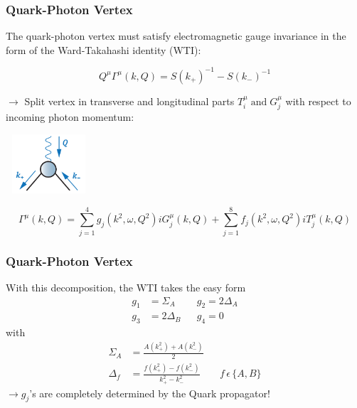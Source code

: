 \begin{frame}\frametitle{Quark-Photon Vertex}
The quark-photon vertex must satisfy electromagnetic gauge invariance in the form of the
Ward-Takahashi identity (WTI):

\begin{equation}
	Q^\mu\Gamma^\mu(k, Q)=S(k_+)^{-1}-S(k_-)^{-1}
\end{equation}

\begin{minipage}[r]{0.65\textwidth}
	$\rightarrow$ Split vertex in transverse and longitudinal parts $T_i^{\mu} \; \text{and} \; G_j^{\mu} $ with respect to incoming photon momentum:
\end{minipage}
\begin{minipage}[r]{0.30\textwidth}
	\hspace{2mm}
	\includegraphics[height=2.2cm, width=3.2cm]{Vertex.png}
\end{minipage}

\begin{equation}
	\Gamma^\mu(k,Q)=\sum_{j=1}^4 g_j(k^2, \omega, Q^2)iG^\mu_j(k, Q)+\sum_{j=1}^8 f_j(k^2, \omega, Q^2)iT^\mu_j(k, Q)
\end{equation}

\end{frame}



\begin{frame}\frametitle{Quark-Photon Vertex}

With this decomposition, the WTI takes the easy form 
%
\begin{align}
g_1 &= \Sigma_A && g_2=2\Delta_A \\\nonumber
g_3&= 2\Delta_B && g_4=0
\end{align}
%
with 
%
\begin{align}
\Sigma_A&=\frac{A(k_+^2) + A(k_-^2)}{2} \\\nonumber
\Delta_f&=\frac{f(k_+^{2}) - f(k_-^2)}{k_+^2 - k_{-}^2} && f\, \epsilon \, \lbrace A,B \rbrace 
\end{align}
%
$\rightarrow g_j$'s are completely determined by the Quark propagator!

\end{frame}


\endinput
